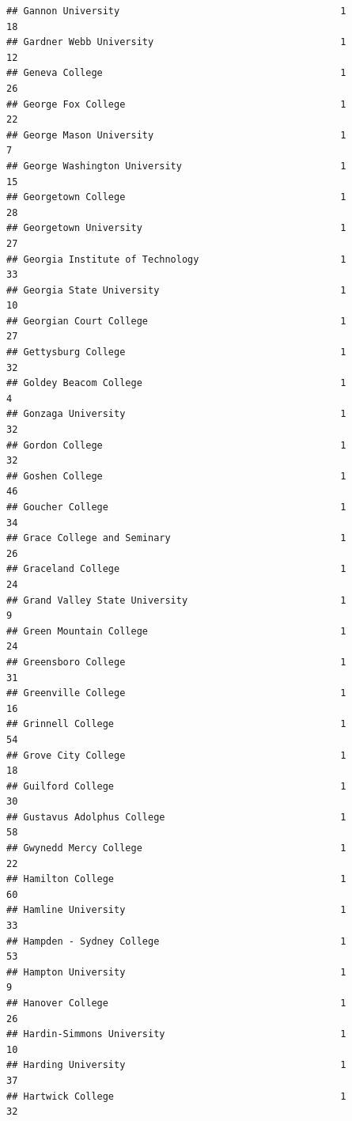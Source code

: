 \documentclass[
]{article}
\begin{document}
\begin{verbatim}
## Gannon University                                       1          18
## Gardner Webb University                                 1          12
## Geneva College                                          1          26
## George Fox College                                      1          22
## George Mason University                                 1           7
## George Washington University                            1          15
## Georgetown College                                      1          28
## Georgetown University                                   1          27
## Georgia Institute of Technology                         1          33
## Georgia State University                                1          10
## Georgian Court College                                  1          27
## Gettysburg College                                      1          32
## Goldey Beacom College                                   1           4
## Gonzaga University                                      1          32
## Gordon College                                          1          32
## Goshen College                                          1          46
## Goucher College                                         1          34
## Grace College and Seminary                              1          26
## Graceland College                                       1          24
## Grand Valley State University                           1           9
## Green Mountain College                                  1          24
## Greensboro College                                      1          31
## Greenville College                                      1          16
## Grinnell College                                        1          54
## Grove City College                                      1          18
## Guilford College                                        1          30
## Gustavus Adolphus College                               1          58
## Gwynedd Mercy College                                   1          22
## Hamilton College                                        1          60
## Hamline University                                      1          33
## Hampden - Sydney College                                1          53
## Hampton University                                      1           9
## Hanover College                                         1          26
## Hardin-Simmons University                               1          10
## Harding University                                      1          37
## Hartwick College                                        1          32

\end{verbatim}
\end{document}
